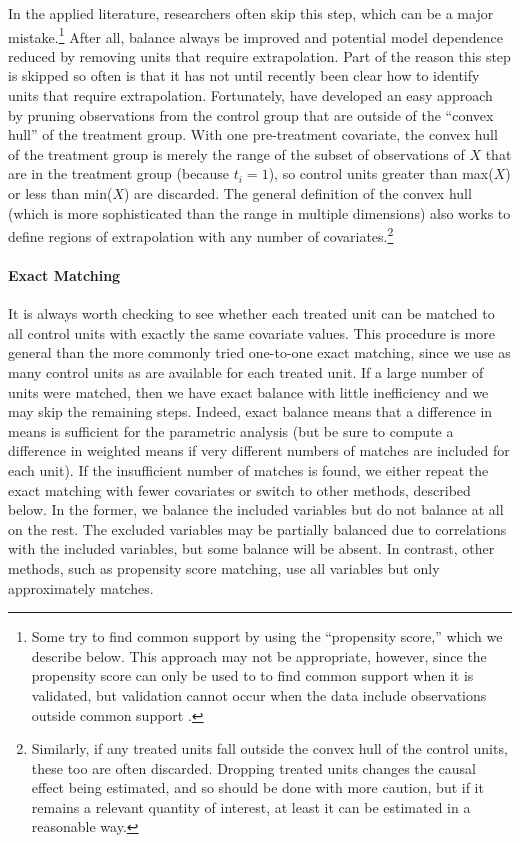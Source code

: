 \documentclass[11pt,titlepage]{article}
\begin{document}
In the applied literature, researchers often skip this step, which can
be a major mistake.\footnote{Some try to find common support by using
  the ``propensity score,'' which we describe below.  This approach
  may not be appropriate, however, since the propensity score can only
  be used to to find common support when it is validated, but
  validation cannot occur when the data include observations outside
  common support \citep[see][and the discussion below]{KinZen06a}.}
After all, balance always be improved and potential model dependence
reduced by removing units that require extrapolation.  Part of the
reason this step is skipped so often is that it has not until recently
been clear how to identify units that require extrapolation.
Fortunately, \citet{KinZen06a} have developed an easy approach by
pruning observations from the control group that are outside of the
``convex hull'' of the treatment group.  With one pre-treatment
covariate, the convex hull of the treatment group is merely the range
of the subset of observations of $X$ that are in the treatment group
(because $t_i=1$), so control units greater than max($X$) or less than
min($X$) are discarded.  The general definition of the convex hull
(which is more sophisticated than the range in multiple dimensions)
also works to define regions of extrapolation with any number of
covariates.\footnote{Similarly, if any treated units fall outside the
  convex hull of the control units, these too are often discarded.
  Dropping treated units changes the causal effect being estimated,
  and so should be done with more caution, but if it remains a
  relevant quantity of interest, at least it can be estimated in a
  reasonable way.}

\paragraph{Exact Matching}  
It is always worth checking to see whether each treated unit can be
matched to all control units with exactly the same covariate values.
This procedure is more general than the more commonly tried one-to-one
exact matching, since we use as many control units as are available
for each treated unit.  If a large number of units were matched, then
we have exact balance with little inefficiency and we may skip the
remaining steps.  Indeed, exact balance means that a difference in
means is sufficient for the parametric analysis (but be sure to
compute a difference in weighted means if very different numbers of
matches are included for each unit).  If the insufficient number of
matches is found, we either repeat the exact matching with fewer
covariates or switch to other methods, described below.  In the
former, we balance the included variables but do not balance at all on
the rest.  The excluded variables may be partially balanced due to
correlations with the included variables, but some balance will be
absent.  In contrast, other methods, such as propensity score
matching, use all variables but only approximately matches.
\end{document}
